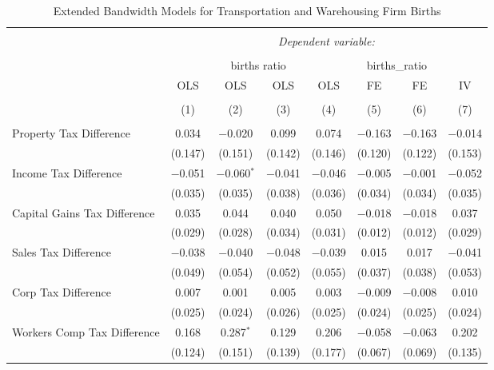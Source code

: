 
\begin{table}[!htbp] \centering 
  \caption{Extended Bandwidth Models for  Transportation and Warehousing Firm Births} 
  \label{} 
\begin{tabular}{@{\extracolsep{5pt}}lccccccc} 
\\[-1.8ex]\hline 
\hline \\[-1.8ex] 
 & \multicolumn{7}{c}{\textit{Dependent variable:}} \\ 
\cline{2-8} 
\\[-1.8ex] & \multicolumn{4}{c}{births ratio} & \multicolumn{2}{c}{births\_ratio} &   \\ 
 & OLS & OLS & OLS & OLS & FE & FE & IV \\ 
\\[-1.8ex] & (1) & (2) & (3) & (4) & (5) & (6) & (7)\\ 
\hline \\[-1.8ex] 
 Property Tax Difference & 0.034 & $-$0.020 & 0.099 & 0.074 & $-$0.163 & $-$0.163 & $-$0.014 \\ 
  & (0.147) & (0.151) & (0.142) & (0.146) & (0.120) & (0.122) & (0.153) \\ 
  Income Tax Difference & $-$0.051 & $-$0.060$^{*}$ & $-$0.041 & $-$0.046 & $-$0.005 & $-$0.001 & $-$0.052 \\ 
  & (0.035) & (0.035) & (0.038) & (0.036) & (0.034) & (0.034) & (0.035) \\ 
  Capital Gains Tax Difference & 0.035 & 0.044 & 0.040 & 0.050 & $-$0.018 & $-$0.018 & 0.037 \\ 
  & (0.029) & (0.028) & (0.034) & (0.031) & (0.012) & (0.012) & (0.029) \\ 
  Sales Tax Difference & $-$0.038 & $-$0.040 & $-$0.048 & $-$0.039 & 0.015 & 0.017 & $-$0.041 \\ 
  & (0.049) & (0.054) & (0.052) & (0.055) & (0.037) & (0.038) & (0.053) \\ 
  Corp Tax Difference & 0.007 & 0.001 & 0.005 & 0.003 & $-$0.009 & $-$0.008 & 0.010 \\ 
  & (0.025) & (0.024) & (0.026) & (0.025) & (0.024) & (0.025) & (0.024) \\ 
  Workers Comp Tax Difference & 0.168 & 0.287$^{*}$ & 0.129 & 0.206 & $-$0.058 & $-$0.063 & 0.202 \\ 
  & (0.124) & (0.151) & (0.139) & (0.177) & (0.067) & (0.069) & (0.135) \\ 

\end{tabular}
\end{table}
